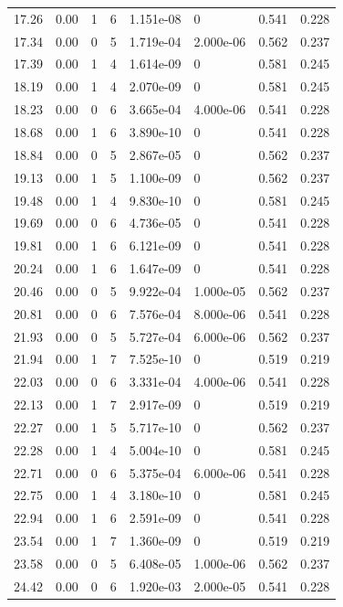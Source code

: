 \documentclass[preview]{standalone}
\begin{document}
{{{\begin{tabular}{L{1.2cm}C{1.2cm} C{0.3cm}C{0.5cm} C{1.4cm}C{1.4cm} C{1.4cm}C{1.4cm}}
  17.26  &  0.00  & 1     &  6 &  1.151e-08  & 0  & 0.541 &  0.228   \\ 
  17.34  &  0.00  & 0     &  5 &  1.719e-04  & 2.000e-06  & 0.562 &  0.237   \\ 
  17.39  &  0.00  & 1     &  4 &  1.614e-09  & 0  & 0.581 &  0.245   \\ 
  18.19  &  0.00  & 1     &  4 &  2.070e-09  & 0  & 0.581 &  0.245   \\ 
  18.23  &  0.00  & 0     &  6 &  3.665e-04  & 4.000e-06  & 0.541 &  0.228   \\ 
  18.68  &  0.00  & 1     &  6 &  3.890e-10  & 0  & 0.541 &  0.228   \\ 
  18.84  &  0.00  & 0     &  5 &  2.867e-05  & 0  & 0.562 &  0.237   \\ 
  19.13  &  0.00  & 1     &  5 &  1.100e-09  & 0  & 0.562 &  0.237   \\ 
  19.48  &  0.00  & 1     &  4 &  9.830e-10  & 0  & 0.581 &  0.245   \\ 
  19.69  &  0.00  & 0     &  6 &  4.736e-05  & 0  & 0.541 &  0.228   \\ 
  19.81  &  0.00  & 1     &  6 &  6.121e-09  & 0  & 0.541 &  0.228   \\ 
  20.24  &  0.00  & 1     &  6 &  1.647e-09  & 0  & 0.541 &  0.228   \\ 
  20.46  &  0.00  & 0     &  5 &  9.922e-04  & 1.000e-05  & 0.562 &  0.237   \\ 
  20.81  &  0.00  & 0     &  6 &  7.576e-04  & 8.000e-06  & 0.541 &  0.228   \\ 
  21.93  &  0.00  & 0     &  5 &  5.727e-04  & 6.000e-06  & 0.562 &  0.237   \\ 
  21.94  &  0.00  & 1     &  7 &  7.525e-10  & 0  & 0.519 &  0.219   \\ 
  22.03  &  0.00  & 0     &  6 &  3.331e-04  & 4.000e-06  & 0.541 &  0.228   \\ 
  22.13  &  0.00  & 1     &  7 &  2.917e-09  & 0  & 0.519 &  0.219   \\ 
  22.27  &  0.00  & 1     &  5 &  5.717e-10  & 0  & 0.562 &  0.237   \\ 
  22.28  &  0.00  & 1     &  4 &  5.004e-10  & 0  & 0.581 &  0.245   \\ 
  22.71  &  0.00  & 0     &  6 &  5.375e-04  & 6.000e-06  & 0.541 &  0.228   \\ 
  22.75  &  0.00  & 1     &  4 &  3.180e-10  & 0  & 0.581 &  0.245   \\ 
  22.94  &  0.00  & 1     &  6 &  2.591e-09  & 0  & 0.541 &  0.228   \\ 
  23.54  &  0.00  & 1     &  7 &  1.360e-09  & 0  & 0.519 &  0.219   \\ 
  23.58  &  0.00  & 0     &  5 &  6.408e-05  & 1.000e-06  & 0.562 &  0.237   \\ 
  24.42  &  0.00  & 0     &  6 &  1.920e-03  & 2.000e-05  & 0.541 &  0.228   \\ 
\hline 
\end{tabular} 

}}}
\end{document}
